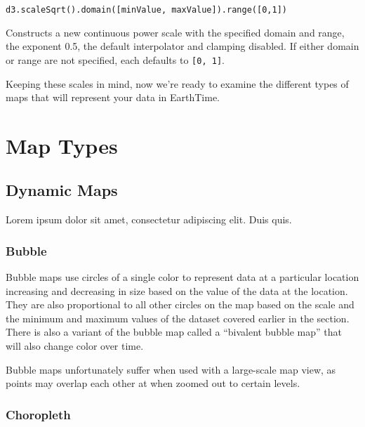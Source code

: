 \documentclass[
]{krantz}
\begin{document}
\texttt{d3.scaleSqrt().domain({[}minValue,\ maxValue{]}).range({[}0,1{]})}

Constructs a new continuous power scale with the specified domain and range, the exponent 0.5, the default interpolator and clamping disabled. If either domain or range are not specified, each defaults to \texttt{{[}0,\ 1{]}}.

Keeping these scales in mind, now we're ready to examine the different types of maps that will represent your data in EarthTime.

\hypertarget{map-types}{%
\section{Map Types}\label{map-types}}

\hypertarget{dynamic-maps}{%
\subsection*{Dynamic Maps}\label{dynamic-maps}}


Lorem ipsum dolor sit amet, consectetur adipiscing elit. Duis quis.

\hypertarget{bubble}{%
\subsubsection*{Bubble}\label{bubble}}


Bubble maps use circles of a single color to represent data at a particular location increasing and decreasing in size based on the value of the data at the location. They are also proportional to all other circles on the map based on the scale and the minimum and maximum values of the dataset covered earlier in the section. There is also a variant of the bubble map called a ``bivalent bubble map'' that will also change color over time.

Bubble maps unfortunately suffer when used with a large-scale map view, as points may overlap each other at when zoomed out to certain levels.

\hypertarget{choropleth}{%
\subsubsection*{Choropleth}\label{choropleth}}
\end{document}
